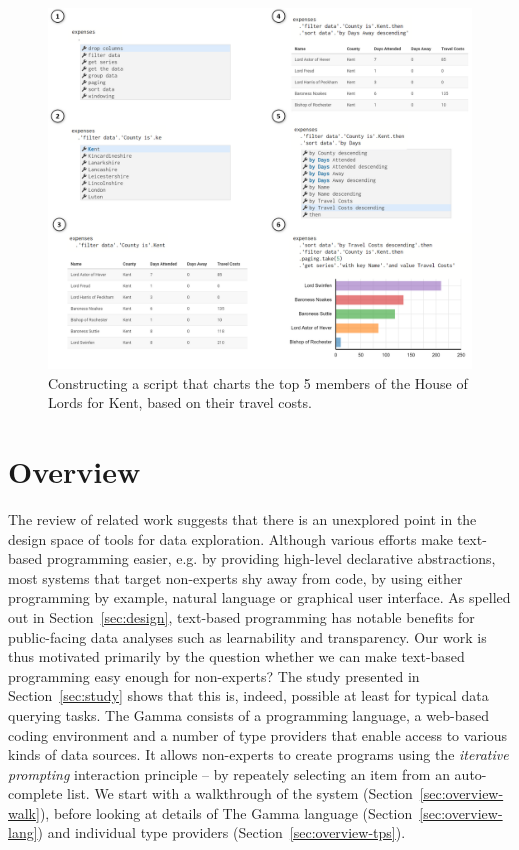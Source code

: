 \documentclass[manuscript,review,anonymous]{acmart}
\begin{document}
\begin{figure}[b]
\includegraphics[width=1\columnwidth]{figures/thegamma-walk}
\caption{Constructing a script that charts the top 5 members of the House of Lords for Kent, based
on their travel costs.}
\label{fig:walkthrough}
\end{figure}


\section{Overview}
\label{sec:overview}

The review of related work suggests that there is an unexplored point in the design space of tools
for data exploration. Although various efforts make text-based programming easier, e.g. by providing
high-level declarative abstractions, most systems that target non-experts shy away from code, by using
either programming by example, natural language or graphical user interface. As spelled out in
Section~\ref{sec:design}, text-based programming has notable benefits for public-facing data analyses
such as learnability and transparency. Our work is thus motivated primarily by the question whether we
can make text-based programming easy enough for non-experts? The study presented in Section~\ref{sec:study}
shows that this is, indeed, possible at least for typical data querying tasks.
The Gamma consists of a programming language, a web-based coding environment and a number of type providers
that enable access to various kinds of data sources. It allows non-experts to create programs using the
\emph{iterative prompting} interaction principle -- by repeately selecting an item from an auto-complete list.
We start with a walkthrough of the system (Section~\ref{sec:overview-walk}), before looking at details of
The Gamma language (Section~\ref{sec:overview-lang}) and individual type providers (Section~\ref{sec:overview-tps}).
\end{document}
